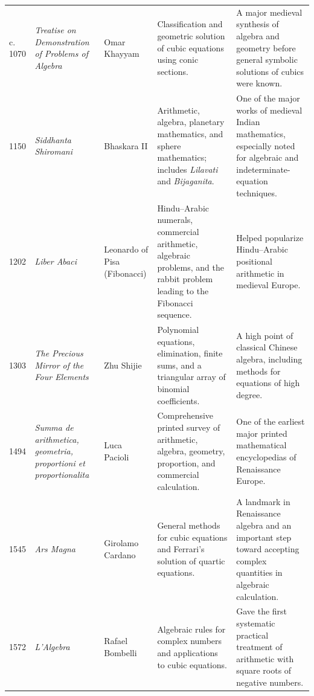 {\begin{longtable}{@{}L{0.08\textwidth}L{0.21\textwidth}L{0.15\textwidth}L{0.22\textwidth}L{0.26\textwidth}@{}}
        c. 1070
        & \textit{Treatise on Demonstration of Problems of Algebra}
        & Omar Khayyam
        & Classification and geometric solution of cubic equations using conic sections.
        & A major medieval synthesis of algebra and geometry before general symbolic solutions of cubics were known. \\

        1150
        & \textit{Siddhanta Shiromani}
        & Bhaskara II
        & Arithmetic, algebra, planetary mathematics, and sphere mathematics; includes \textit{Lilavati} and \textit{Bijaganita}.
        & One of the major works of medieval Indian mathematics, especially noted for algebraic and indeterminate-equation techniques. \\

        1202
        & \textit{Liber Abaci}
        & Leonardo of Pisa (Fibonacci)
        & Hindu--Arabic numerals, commercial arithmetic, algebraic problems, and the rabbit problem leading to the Fibonacci sequence.
        & Helped popularize Hindu--Arabic positional arithmetic in medieval Europe. \\

        1303
        & \textit{The Precious Mirror of the Four Elements}
        & Zhu Shijie
        & Polynomial equations, elimination, finite sums, and a triangular array of binomial coefficients.
        & A high point of classical Chinese algebra, including methods for equations of high degree. \\

        1494
        & \textit{Summa de arithmetica, geometria, proportioni et proportionalita}
        & Luca Pacioli
        & Comprehensive printed survey of arithmetic, algebra, geometry, proportion, and commercial calculation.
        & One of the earliest major printed mathematical encyclopedias of Renaissance Europe. \\

        1545
        & \textit{Ars Magna}
        & Girolamo Cardano
        & General methods for cubic equations and Ferrari's solution of quartic equations.
        & A landmark in Renaissance algebra and an important step toward accepting complex quantities in algebraic calculation. \\

        1572
        & \textit{L'Algebra}
        & Rafael Bombelli
        & Algebraic rules for complex numbers and applications to cubic equations.
        & Gave the first systematic practical treatment of arithmetic with square roots of negative numbers. \\


\end{longtable}}
